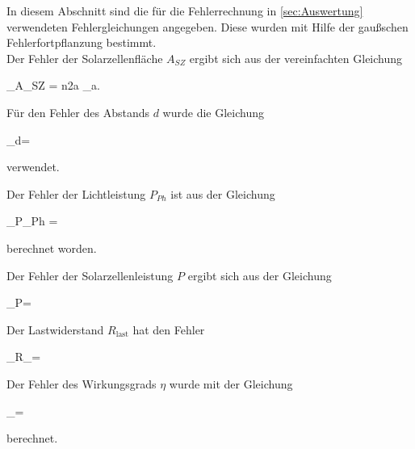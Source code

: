 In diesem Abschnitt sind die für die Fehlerrechnung in \cref{sec:Auswertung} verwendeten Fehlergleichungen angegeben.
Diese wurden mit Hilfe der gaußschen Fehlerfortpflanzung bestimmt.\\

Der Fehler der Solarzellenfläche $A_{SZ}$ ergibt sich aus der vereinfachten Gleichung
\begin{errorEquation}
	\label{std:Fläche}
	\sigma_{A_{SZ}} = n\cdot 2a \cdot \sigma_{a}.
\end{errorEquation}  
Für den Fehler des Abstands $d$ wurde die Gleichung
\begin{errorEquation}
	\label{std:Abstand}
	\sigma_{d}=
\end{errorEquation}
verwendet.

Der Fehler der Lichtleistung $P_{Ph}$ ist aus der Gleichung  
\begin{errorEquation}
	\label{std:Lichtleistung}
	\sigma_{P_{Ph}} = 
\end{errorEquation}
berechnet worden.

Der Fehler der Solarzellenleistung $P$ ergibt sich aus der Gleichung
\begin{errorEquation}
	\label{std:Solarzellenleistung}
	\sigma_{P}=
\end{errorEquation}

Der Lastwiderstand $R_{\text{last}}$ hat den Fehler
\begin{errorEquation}
	\label{std:Lastwiderstand}
	\sigma_{R_{}}=
\end{errorEquation}

Der Fehler des Wirkungsgrads $\eta$ wurde mit der Gleichung
\begin{errorEquation}
	\label{std:Wirkungsgrad}
	\sigma_{\eta}=
\end{errorEquation}
berechnet.
